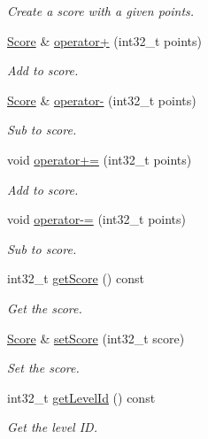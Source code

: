 \begin{DoxyCompactItemize}
\begin{DoxyCompactList}\small\item\em Create a score with a given points. \end{DoxyCompactList}\item 
\hyperlink{class_score}{Score} \& \hyperlink{class_score_a57078d193a0196f8589e9b6ff44043b9}{operator+} (int32\+\_\+t points)
\begin{DoxyCompactList}\small\item\em Add to score. \end{DoxyCompactList}\item 
\hyperlink{class_score}{Score} \& \hyperlink{class_score_ada72aeab821258696786fdac3c6705fb}{operator-\/} (int32\+\_\+t points)
\begin{DoxyCompactList}\small\item\em Sub to score. \end{DoxyCompactList}\item 
void \hyperlink{class_score_aa09c8d15c82ba3edcd2ae56d8cf413ab}{operator+=} (int32\+\_\+t points)
\begin{DoxyCompactList}\small\item\em Add to score. \end{DoxyCompactList}\item 
void \hyperlink{class_score_a7e3638503831135f9faf77ed7feba03f}{operator-\/=} (int32\+\_\+t points)
\begin{DoxyCompactList}\small\item\em Sub to score. \end{DoxyCompactList}\item 
int32\+\_\+t \hyperlink{class_score_a43eef6c9709196a5901a613519dea473}{get\+Score} () const
\begin{DoxyCompactList}\small\item\em Get the score. \end{DoxyCompactList}\item 
\hyperlink{class_score}{Score} \& \hyperlink{class_score_a8dc456d08a9c2b08935ca58f4cf8ba0f}{set\+Score} (int32\+\_\+t score)
\begin{DoxyCompactList}\small\item\em Set the score. \end{DoxyCompactList}\item 
int32\+\_\+t \hyperlink{class_score_a0a14f2b51f134e97551f4ac57401a0ce}{get\+Level\+Id} () const
\begin{DoxyCompactList}\small\item\em Get the level ID. \end{DoxyCompactList}\item 

\end{DoxyCompactItemize}
